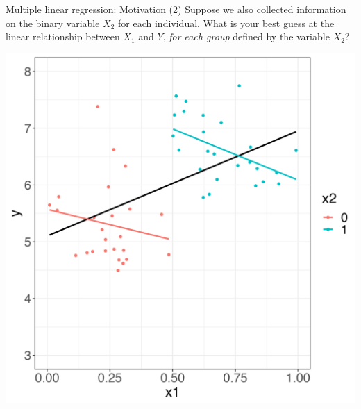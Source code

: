 \documentclass[10pt,t]{beamer}
\begin{document}
\begin{frame}{Multiple linear regression: Motivation}
(2) Suppose we also collected information on the binary variable $X_2$ for each individual. What is your best guess at the linear relationship between $X_1$ and $Y$, \textit{for each group} defined by the variable $X_2$? 

\vspace{0.3cm}

\centering \includegraphics[scale=0.3]{multreg4.png}

\end{frame}
\end{document}
